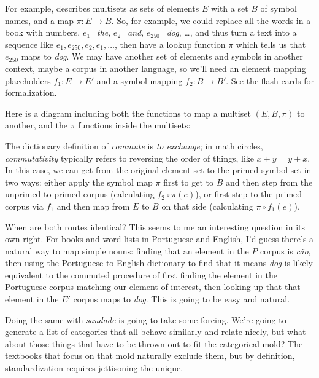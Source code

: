 \documentclass[11pt]{article}
\begin{document}
For example,
\citet{spivak:category} describes multisets as sets of elements $E$ with a set $B$ of
symbol names, and a map $\pi:E\to B$. So, for example, we could replace all the words in a
book with numbers, $e_1$={\em the}, $e_2$={\em and}, $e_{250}$={\em dog}, \dots, and thus
turn a text into a sequence like $e_1, e_{250}, e_2, e_1, \dots$, then have a lookup
function $\pi$ which tells us that $e_{250}$ maps to {\em dog}. We
may have another set of elements and symbols in another context, maybe a corpus in
another language, so we'll need an element mapping placeholders $f_1:E\to E'$ and a symbol mapping
$f_2:B\to B'$. See the flash cards for formalization.

Here is a diagram including both
 the functions to map a multiset $(E, B, \pi)$ to another, and
the $\pi$ functions inside the multisets:

The dictionary definition of {\em
commute} is {\em to exchange}; in math circles, {\em commutativity} typically refers to
reversing the order of things, like $x+y = y+x$. In this case, we can 
get from the original element set to the primed symbol set in two ways:
either apply the symbol map $\pi$ first to get to $B$ and then step from the unprimed to
primed corpus (calculating $f_2\circ\pi(e)$), or first step to the primed corpus via $f_1$ and then
map from $E$ to $B$ on that side (calculating $\pi\circ f_1(e)$).

When are both routes identical? This seems to me an interesting question in its own right.
For books and word lists in Portuguese and English, I'd guess there's a natural
way to map simple nouns: finding that an element in the $P$ corpus is {\em cão},
then using the Portuguese-to-English dictionary to find that it means {\em dog}
is likely equivalent to the commuted procedure of first finding the element in the
Portuguese corpus matching our element of interest, then looking up that that element in
the $E'$ corpus maps to {\em dog}. This is going to be easy and natural.

Doing the same with {\em saudade} is going to take some forcing.
We're going to generate a list of
categories that all behave similarly and relate nicely, but what about those things
that have to be thrown out to fit the categorical mold? The textbooks that focus on
that mold naturally exclude them, but by definition, standardization requires jettisoning 
the unique.
\end{document}
